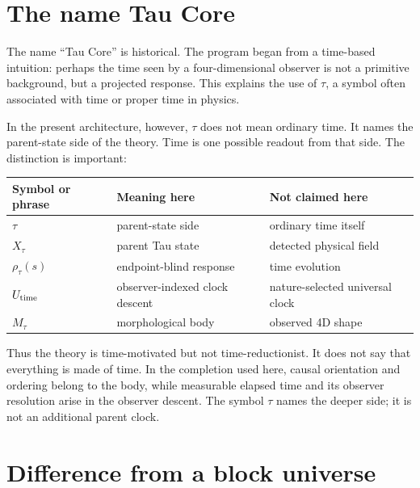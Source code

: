 \documentclass[11pt]{article}
\newcommand{\Rmap}{\rho_{\tau}}
\newcommand{\Mta}{M_{\tau}}
\begin{document}
\section{The name Tau Core}

The name ``Tau Core'' is historical.  The program began from a time-based
intuition: perhaps the time seen by a four-dimensional observer is not a
primitive background, but a projected response.  This explains the use of
\(\tau\), a symbol often associated with time or proper time in physics.

In the present architecture, however, \(\tau\) does not mean ordinary time.  It
names the parent-state side of the theory.  Time is one possible readout from
that side.  The distinction is important:
\begin{center}
\begin{tabular}{lll}
\toprule
Symbol or phrase & Meaning here & Not claimed here\\
\midrule
\(\tau\) & parent-state side & ordinary time itself\\
\(X_{\tau}\) & parent Tau state & detected physical field\\
\(\Rmap(s)\) & endpoint-blind response & time evolution\\
\(U_{\rm time}\) & observer-indexed clock descent & nature-selected universal clock\\
\(\Mta\) & morphological body & observed 4D shape\\
\bottomrule
\end{tabular}
\end{center}

Thus the theory is time-motivated but not time-reductionist.  It does not say
that everything is made of time.  In the completion used here, causal
orientation and ordering belong to the body, while measurable elapsed time and
its observer resolution arise in the observer descent.  The symbol \(\tau\)
names the deeper side; it is not an additional parent clock.

\section{Difference from a block universe}
\end{document}
